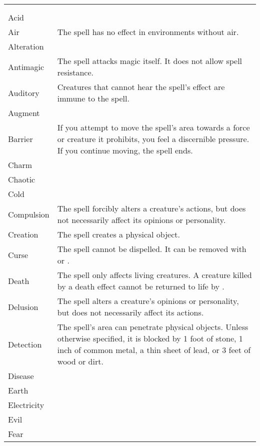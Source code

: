 {
    \onecolumn
    \begin{longtabu}{l X}
         \\
         &  \\
        Acid & \x \\
        Air & The spell has no effect in environments without air. \\
        Alteration & \x \\
        Antimagic & The spell attacks magic itself. It does not allow spell resistance. \\
        Auditory & Creatures that cannot hear the spell's effect are immune to the spell. \\
        Augment & \x \\
        Barrier & If you attempt to move the spell's area towards a force or creature it prohibits, you feel a discernible pressure. If you continue moving, the spell ends. \\
        Charm & \x \\
        Chaotic & \x \\
        Cold & \x \\
        Compulsion & The spell forcibly alters a creature's actions, but does not necessarily affect its opinions or personality. \\
        Creation & The spell creates a physical object. \\
        Curse & The spell cannot be dispelled. It can be removed with  or . \\
        Death & The spell only affects living creatures. A creature killed by a death effect cannot be returned to life by . \\
        Delusion & The spell alters a creature's opinions or personality, but does not necessarily affect its actions. \\
        Detection & The spell's area can penetrate physical objects. Unless otherwise specified, it is blocked by 1 foot of stone, 1 inch of common metal, a thin sheet of lead, or 3 feet of wood or dirt. \\
        Disease & \x \\
        Earth & \x \\
        Electricity & \x \\
        Evil & \x \\
        Fear & \x \\

\end{longtabu}}
